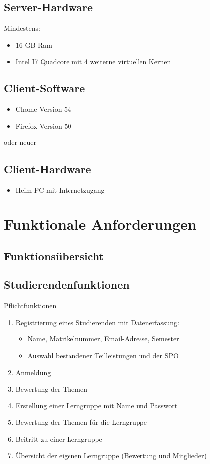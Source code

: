 \documentclass[parskip=full]{scrartcl}
\newcommand{\swtLabel}[1]{\textbf{\textbackslash #1\arabic*0\textbackslash}}
\begin{document}
\subsection{Server-Hardware}
Mindestens:
\begin{itemize} 
  \item 16 GB Ram
  \item Intel I7 Quadcore mit 4 weiterne virtuellen Kernen 
\end{itemize}

\subsection{Client-Software}
\begin{itemize}
  \item Chome Version 54
  \item Firefox Version 50
\end{itemize}
oder neuer
\subsection{Client-Hardware}
\begin{itemize}
  \item Heim-PC mit Internetzugang
\end{itemize}
\section{Funktionale Anforderungen}

\subsection{Funktionsübersicht}

\subsection{Studierendenfunktionen}

Pflichtfunktionen

\begin{enumerate}[label=\swtLabel{FA}]
  \item Registrierung eines Studierenden mit Datenerfassung:
  \begin{itemize}
    \item Name, Matrikelnummer, Email-Adresse, Semester
    \item Auswahl bestandener Teilleistungen und der SPO
  \end{itemize}
  \item Anmeldung
  \item Bewertung der Themen
  \item Erstellung einer Lerngruppe mit Name und Passwort
  \item Bewertung der Themen für die Lerngruppe
  \item Beitritt zu einer Lerngruppe
  \item Übersicht der eigenen Lerngruppe (Bewertung und Mitglieder)
\end{enumerate}
\end{document}

